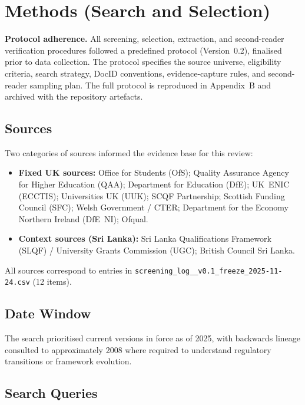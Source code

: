 \section{Methods (Search and Selection)}

\noindent
\textbf{Protocol adherence.}  
All screening, selection, extraction, and second-reader verification procedures
followed a predefined protocol (Version~0.2), finalised prior to data
collection. The protocol specifies the source universe, eligibility criteria,
search strategy, DocID conventions, evidence-capture rules, and second-reader
sampling plan. The full protocol is reproduced in Appendix~B and archived with
the repository artefacts.


\subsection{Sources}

Two categories of sources informed the evidence base for this review:

\begin{itemize}
    \item \textbf{Fixed UK sources:} Office for Students (OfS); Quality Assurance Agency for Higher Education (QAA); Department for Education (DfE); UK~ENIC (ECCTIS); Universities UK (UUK); SCQF Partnership; Scottish Funding Council (SFC); Welsh Government / CTER; Department for the Economy Northern Ireland (DfE~NI); Ofqual.
    \item \textbf{Context sources (Sri Lanka):} Sri Lanka Qualifications Framework 
    (SLQF) / University Grants Commission (UGC); British Council Sri Lanka.
\end{itemize}

All sources correspond to entries in \texttt{screening\_log\_\_v0.1\_freeze\_2025-11-24.csv} (12 items).

\subsection{Date Window}

The search prioritised current versions in force as of 2025, with backwards lineage consulted to approximately 2008 where required to understand regulatory transitions or framework evolution.

\subsection{Search Queries}

